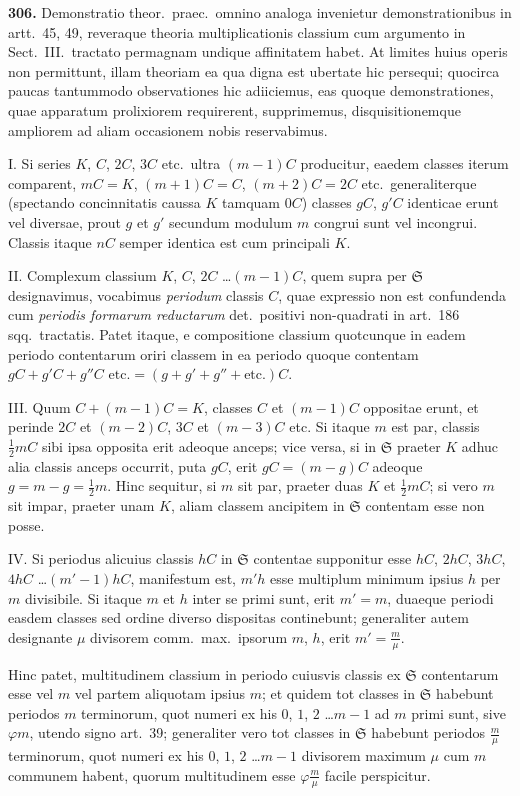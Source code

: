 \documentclass[12pt,a4paper]{article}
\theoremstyle{plain}
\theoremstyle{definition}
\theoremstyle{remark}
\begin{document}
\textbf{306.} Demonstratio theor.~praec.~omnino analoga invenietur demonstrationibus in artt.~45, 49, reveraque theoria multiplicationis classium cum argumento in Sect.~III.~tractato permagnam undique affinitatem habet. At limites huius operis non permittunt, illam theoriam ea qua digna est ubertate hic persequi; quocirca paucas tantummodo observationes hic adiiciemus, eas quoque demonstrationes, quae apparatum prolixiorem requirerent, supprimemus, disquisitionemque ampliorem ad aliam occasionem nobis reservabimus.

\textsc{I.} Si series $K$, $C$, $2C$, $3C$ etc.~ultra $(m-1)C$ producitur, eaedem classes iterum comparent, $mC = K$, $(m+1)C = C$, $(m+2)C = 2C$ etc.~generaliterque (spectando concinnitatis caussa $K$ tamquam $0C$) classes $gC$, $g'C$ identicae erunt vel diversae, prout $g$ et $g'$ secundum modulum $m$ congrui sunt vel incongrui. Classis itaque $nC$ semper identica est cum principali $K$.

\textsc{II.} Complexum classium $K$, $C$, $2C$ \ldots $(m-1)C$, quem supra per $\mathfrak{S}$ designavimus, vocabimus \textit{periodum} classis $C$, quae expressio non est confundenda cum \textit{periodis formarum reductarum} det.~positivi non-quadrati in art.~186 sqq.~tractatis. Patet itaque, e compositione classium quotcunque in eadem periodo contentarum oriri classem in ea periodo quoque contentam $gC + g'C + g''C \text{ etc.} = (g + g' + g'' + \text{etc.})C$.

\textsc{III.} Quum $C + (m-1)C = K$, classes $C$ et $(m-1)C$ oppositae erunt, et perinde $2C$ et $(m-2)C$, $3C$ et $(m-3)C$ etc. Si itaque $m$ est par, classis $\tfrac{1}{2}mC$ sibi ipsa opposita erit adeoque anceps; vice versa, si in $\mathfrak{S}$ praeter $K$ adhuc alia classis anceps occurrit, puta $gC$, erit $gC = (m-g)C$ adeoque $g = m - g = \tfrac{1}{2}m$. Hinc sequitur, si $m$ sit par, praeter duas $K$ et $\tfrac{1}{2}mC$; si vero $m$ sit impar, praeter unam $K$, aliam classem ancipitem in $\mathfrak{S}$ contentam esse non posse.

\textsc{IV.} Si periodus alicuius classis $hC$ in $\mathfrak{S}$ contentae supponitur esse $hC$, $2hC$, $3hC$, $4hC$ \ldots $(m'-1)hC$, manifestum est, $m'h$ esse multiplum minimum ipsius $h$ per $m$ divisibile. Si itaque $m$ et $h$ inter se primi sunt, erit $m' = m$, duaeque periodi easdem classes sed ordine diverso dispositas continebunt; generaliter autem designante $\mu$ divisorem comm.~max.~ipsorum $m$, $h$, erit $m' = \tfrac{m}{\mu}$.

Hinc patet, multitudinem classium in periodo cuiusvis classis ex $\mathfrak{S}$ contentarum esse vel $m$ vel partem aliquotam ipsius $m$; et quidem tot classes in $\mathfrak{S}$ habebunt periodos $m$ terminorum, quot numeri ex his $0$, $1$, $2$ \ldots $m-1$ ad $m$ primi sunt, sive $\varphi m$, utendo signo art.~39; generaliter vero tot classes in $\mathfrak{S}$ habebunt periodos $\tfrac{m}{\mu}$ terminorum, quot numeri ex his $0$, $1$, $2$ \ldots $m-1$ divisorem maximum $\mu$ cum $m$ communem habent, quorum multitudinem esse $\varphi\tfrac{m}{\mu}$ facile perspicitur.
\end{document}
